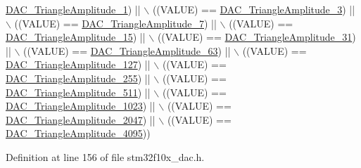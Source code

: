 \begin{DoxyCode}
      \hyperlink{group___d_a_c__lfsrunmask__triangleamplitude_ga49b1eddf4e6371b4be8751162dc94ac4}{DAC\_TriangleAmplitude\_1}) || \(\backslash\)
                                                      ((VALUE) == 
      \hyperlink{group___d_a_c__lfsrunmask__triangleamplitude_ga9798d68c3bbf0a57306bf2f962697377}{DAC\_TriangleAmplitude\_3}) || \(\backslash\)
                                                      ((VALUE) == 
      \hyperlink{group___d_a_c__lfsrunmask__triangleamplitude_gad3f31de1277836df1109576a53c47e87}{DAC\_TriangleAmplitude\_7}) || \(\backslash\)
                                                      ((VALUE) == 
      \hyperlink{group___d_a_c__lfsrunmask__triangleamplitude_ga42653712ce783d33ecb2f3e97e9c2ece}{DAC\_TriangleAmplitude\_15}) || \(\backslash\)
                                                      ((VALUE) == 
      \hyperlink{group___d_a_c__lfsrunmask__triangleamplitude_ga10b15745b749c62a56bd3d7bd5a27e1b}{DAC\_TriangleAmplitude\_31}) || \(\backslash\)
                                                      ((VALUE) == 
      \hyperlink{group___d_a_c__lfsrunmask__triangleamplitude_gaaae92dae9c4da55e29c645396825e36b}{DAC\_TriangleAmplitude\_63}) || \(\backslash\)
                                                      ((VALUE) == 
      \hyperlink{group___d_a_c__lfsrunmask__triangleamplitude_gaacec0af3f69db46f8984be3af9ecadfb}{DAC\_TriangleAmplitude\_127}) || \(\backslash\)
                                                      ((VALUE) == 
      \hyperlink{group___d_a_c__lfsrunmask__triangleamplitude_gadb404422c86a7b92d78e6d9617e8ce4d}{DAC\_TriangleAmplitude\_255}) || \(\backslash\)
                                                      ((VALUE) == 
      \hyperlink{group___d_a_c__lfsrunmask__triangleamplitude_ga565b0c97bbdf152756617d491bf8ef85}{DAC\_TriangleAmplitude\_511}) || \(\backslash\)
                                                      ((VALUE) == 
      \hyperlink{group___d_a_c__lfsrunmask__triangleamplitude_ga7d573b0cebb1b939bd83367effb93d89}{DAC\_TriangleAmplitude\_1023}) || \(\backslash\)
                                                      ((VALUE) == 
      \hyperlink{group___d_a_c__lfsrunmask__triangleamplitude_gad33d28d7fcc09d84500ea9b6e6c5feed}{DAC\_TriangleAmplitude\_2047}) || \(\backslash\)
                                                      ((VALUE) == 
      \hyperlink{group___d_a_c__lfsrunmask__triangleamplitude_ga3ce69f5a63a2464dc4b5f73cb6fe72f5}{DAC\_TriangleAmplitude\_4095}))
\end{DoxyCode}


Definition at line 156 of file stm32f10x\+\_\+dac.\+h.

